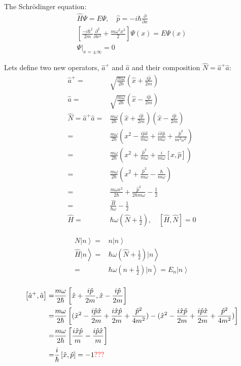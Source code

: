 		The Schr\"odinger equation:
		\begin{align}
			\hat{H}\Psi = E\Psi, \quad \hat{p} = -i\hbar\frac{\partial}{\partial x} \\
			\left[\frac{-i\hbar^2}{2m} \frac{\partial^2}{\partial x^2} + \frac{m\omega^2x^2}{2}\right]\Psi(x) = E\Psi(x) \\
			\Psi|_{x = \pm \infty} = 0
		\end{align}
		
		Lets define two new operators, $\hat{a}^+$ and $\hat{a}$ and their composition $\hat{N} = \hat{a}^+\hat{a}$:
		\begin{align}
			\hat{a}^+ =& \sqrt{\frac{m\omega}{2\hbar}}\left(\hat{x} + \frac{i\hat{p}}{2m}\right) \\
			\hat{a} =& \sqrt{\frac{m\omega}{2\hbar}}\left(\hat{x} - \frac{i\hat{p}}{2m}\right) \\
			\hat{N} = \hat{a}^+\hat{a} =& \frac{m\omega}{2\hbar}\left(\hat{x} + \frac{i\hat{p}}{2m}\right)\left(\hat{x} - \frac{i\hat{p}}{2m}\right)\\
			=& \frac{m\omega}{2\hbar}\left( x^2 - \frac{i\hat{p}\hat{x}}{m\omega} + \frac{i\hat{x}\hat{p}}{m\omega} + \frac{\hat{p}^2}{m^2\omega^2} \right)\\
			=& \frac{m\omega}{2\hbar}\left(x^2 + \frac{\hat{p}^2}{m\omega} + \frac{i}{m\omega}\left[\hat{x}, \hat{p}\right]\right)\\
			=&\frac{m\omega}{2\hbar}\left(x^2 + \frac{\hat{p}^2}{m\omega} - \frac{\hbar}{m\omega}\right)\\
			=& \frac{m\omega x^2}{2\hbar} + \frac{\hat{p}^2}{2\hbar m\omega} - \frac{1}{2}\\
			=& \frac{\hat{H}}{\hbar\omega} - \frac{1}{2}\\
			\hat{H} =& \hbar\omega\left(\hat{N} + \frac{1}{2}\right),\quad \left[\hat{H}, \hat{N}\right] = 0
		\end{align}
	
		\begin{align}
			\left. N | n \right\rangle =& \left. n |n \right\rangle \\
			\left. \hat{H} | n \right\rangle =& \left. \hbar\omega\left(\hat{N} + \frac{1}{2}\right) | n \right\rangle\\
			 =& \left. \hbar\omega\left(n + \frac{1}{2}\right) | n \right\rangle = \left. E_n | n \right\rangle\\		
		\end{align}
	
		\begin{align}
			\left[\hat{a}^+, \hat{a}\right] =& \frac{m\omega}{2\hbar}\left[\hat{x} + \frac{i\hat{p}}{2m}, \hat{x} - \frac{i\hat{p}}{2m}\right]\\
			=& \frac{m\omega}{2\hbar}\left[(\hat{x}^2 - \frac{i\hat{p}\hat{x}}{2m} + \frac{i\hat{x}\hat{p}}{2m} +\frac{\hat{p}^2}{4m^2}) - (\hat{x}^2  - \frac{i\hat{x}\hat{p}}{2m} + \frac{i\hat{p}\hat{x}}{2m} +\frac{\hat{p}^2}{4m^2})\right] \\
			=& \frac{m\omega}{2\hbar}\left[\frac{i\hat{x}\hat{p}}{m} -\frac{i\hat{p}\hat{x}}{m}\right]\\
			=& \frac{i}{\hbar}\left[\hat{x}, \hat{p}\right] = -1 \text{\textcolor{red}{???}}
		\end{align}
	
